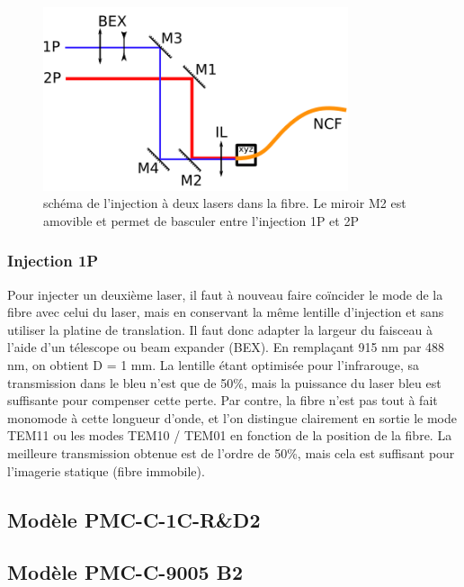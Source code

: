 \begin{figure}
\centering
\includegraphics[width=0.8\textwidth]{./files/injection.svg.png}
\caption{schéma de l'injection à deux lasers dans la fibre. Le miroir M2 est amovible et permet de basculer entre l'injection 1P et 2P}
\end{figure}

\subsubsection{Injection 1P}

Pour injecter un deuxième laser, il faut à nouveau faire coïncider le mode de la fibre avec celui du laser, mais en conservant la même lentille d'injection et sans utiliser la platine de translation. Il faut donc adapter la largeur du faisceau à l'aide d'un télescope ou beam expander (BEX). En remplaçant 915 nm par 488 nm, on obtient D = 1 mm. La lentille étant optimisée pour l'infrarouge, sa transmission dans le bleu n'est que de 50\%, mais la puissance du laser bleu est suffisante pour compenser cette perte. Par contre, la fibre n'est pas tout à fait monomode à cette longueur d'onde, et l'on distingue clairement en sortie le mode TEM11 ou les modes TEM10 / TEM01 en fonction de la position de la fibre. La meilleure transmission obtenue est de l'ordre de 50\%, mais cela est suffisant pour l'imagerie statique (fibre immobile).

\subsection{Modèle PMC-C-1C-R\&D2}

\subsection{Modèle PMC-C-9005 B2}


